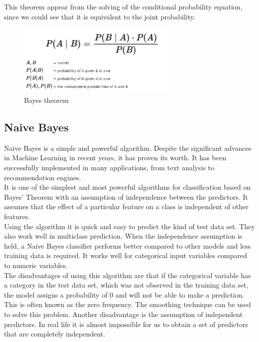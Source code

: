\documentclass[sigconf,12pt,review=false,natbib=false]{acmart}
\begin{document}
This theorem appear from the solving of the conditional probability equation, since we could see
that it is equivalent to the joint probability. \\

\begin{figure}[h!]
    \centering
    \includegraphics[width=3in]{bayes}
    \caption{Bayes theorem}
    \label{fig:jcp_relationship}
\end{figure}

\subsection{Naive Bayes}

Naive Bayes is a simple and powerful algorithm. Despite the significant advances in Machine Learning in recent
years, it has proven its worth. It has been successfully implemented in many applications, from text analysis
to recommendation engines. \\

It is one of the simplest and most powerful algorithms for classification based on Bayes' Theorem with an assumption
of independence between the predictors. It assumes that the effect of a particular feature on a class is independent
of other features. \\

Using the algorithm it is quick and easy to predict the kind of test data set. They also work well in multiclass
prediction. When the independence assumption is held, a Naive Bayes classifier performs better compared to other
models and less training data is required. It works well for categorical input variables compared to
numeric variables. \\

The disadvantages of using this algorithm are that if the categorical variable has a category in the test data set,
which was not observed in the training data set, the model assigns a probability of 0 and will not be able to make
a prediction. This is often known as the zero frequency. The smoothing technique can be used to solve this problem.
Another disadvantage is the assumption of independent predictors. In real life it is almost impossible for us to
obtain a set of predictors that are completely independent. \\
\end{document}

